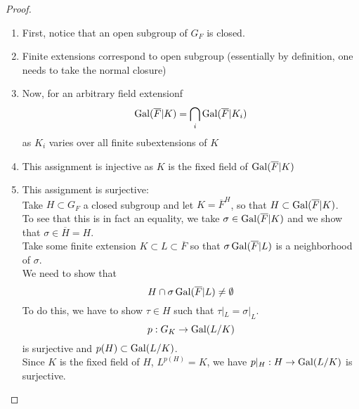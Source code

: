 \documentclass[../main.tex]{subfiles}
\begin{document}
\begin{proof}
\begin{enumerate}
	\item First, notice that an open subgroup of $G_F$ is closed.
\item Finite extensions correspond to open subgroup (essentially by definition, one needs to take the normal closure) 
\item Now, for an arbitrary field extensionf
	\[ 
	\operatorname{Gal}( \overline{F}| K) = \bigcap_i \operatorname{Gal}( \overline{F}| K_i) 
	\]
	as $K_i$ varies over all finite subextensions of $K$ 
\item This assignment is injective as $K$ is the fixed field of $\operatorname{Gal}( \overline{F}| K) $ 
\item This assignment is surjective:\\
	Take $H \subset G_F$ a closed subgroup and let $K = \overline{F}^{H}$, so that $H \subset \operatorname{Gal} ( \overline{F}|K) $.\\
	To see that this is in fact an equality, we take $\sigma\in \operatorname{Gal}( \overline{F}| K) $ and we show that $\sigma \in \overline{H}=H$.\\
	Take some finite extension $K \subset L \subset \overline{F}$ so that $\sigma \operatorname{Gal}( \overline{F}|L) $ is a neighborhood of $\sigma$.\\
	We need to show that 
	\[ 
	H\cap \sigma \operatorname{Gal}( \overline{F}| L) \neq \emptyset
	\]
	To do this, we have to show $\tau \in H$ such that $\tau|_L = \sigma|_L$.
	\[ 
	p: G_K \to \operatorname{Gal}( L/K) 
	\]
	is surjective and $p( H) \subset \operatorname{Gal}( L /K) $.\\
	Since $K$ is the fixed field of $H$, $L^{p( H) }= K$, we have $p|_H : H \to \operatorname{Gal} ( L /K) $ is surjective.
	
\end{enumerate}

\end{proof}
\end{document}
